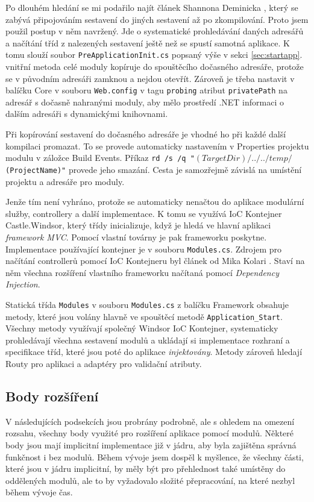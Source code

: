 \documentclass[11pt,twoside,a4paper]{book}
\begin{document}
Po dlouhém hledání se mi podařilo najít článek Shannona Deminicka \cite{Shazwazza}, který se zabývá připojováním sestavení do jiných sestavení až po zkompilování. Proto jsem použil postup v něm navržený. Jde o systematické prohledávání daných adresářů a načítání tříd z nalezených sestavení ještě než se spustí samotná aplikace. K tomu slouží soubor \texttt{PreApplicationInit.cs} popsaný výše v sekci \ref{sec:startapp}. vnitřní metoda celé moduly kopíruje do spouštěcího dočasného adresáře, protože se v původním adresáři zamknou a nejdou otevřít. Zároveň je třeba nastavit v balíčku \textsf{Core} v souboru \texttt{Web.config} v tagu \texttt{probing} atribut \texttt{privatePath} na adresář s dočasně nahranými moduly, aby mělo prostředí .NET informaci o dalším adresáři s dynamickými knihovnami.

Při kopírování sestavení do dočasného adresáře je vhodné ho při každé další kompilaci promazat. To se provede automaticky nastavením v Properties projektu modulu v záložce Build Events. Příkaz \texttt{rd /s /q "$(TargetDir)/../../temp/$(ProjectName)"} provede jeho smazání. Cesta je samozřejmě závislá na umístění projektu a adresáře pro moduly.

Jenže tím není vyhráno, protože se automaticky nenačtou do aplikace modulární služby, controllery a další implementace. K tomu se využívá IoC Kontejner \textsf{Castle.Windsor}, který třídy inicializuje, když je hledá ve hlavní aplikaci \textit{framework MVC}. Pomocí vlastní továrny je pak frameworku poskytne. Implementace používající kontejner je v souboru \texttt{Modules.cs}. Zdrojem pro načítání controllerů pomocí IoC Kontejneru byl článek od Mika Kolari \cite{kolari}. Staví na něm všechna rozšíření vlastního frameworku načítaná pomocí \textit{Dependency Injection}.

Statická třída \texttt{Modules} v souboru \texttt{Modules.cs} z balíčku \textsf{Framework} obsahuje metody, které jsou volány hlavně ve spouštěcí metodě \texttt{Application\_Start}. Všechny metody využívají společný Windsor IoC Kontejner, systematicky prohledávají všechna sestavení modulů a ukládají si implementace rozhraní a specifikace tříd, které jsou poté do aplikace \textit{injektovány}.
Metody zároveň hledají Routy pro aplikaci a adaptéry pro validační atributy.

\subsection{Body rozšíření}

V následujících podsekcích jsou probrány podrobně, ale s ohledem na omezení rozsahu, všechny body využité pro rozšíření aplikace pomocí modulů. Některé body jsou mají implicitní implementace již v jádru, aby byla zajištěna správná funkčnost i bez modulů. Během vývoje jsem dospěl k myšlence, že všechny části, které jsou v jádru implicitní, by měly být pro přehlednost také umístěny do oddělených modulů, ale to by vyžadovalo složité přepracování, na které nezbyl během vývoje čas.
\end{document}
